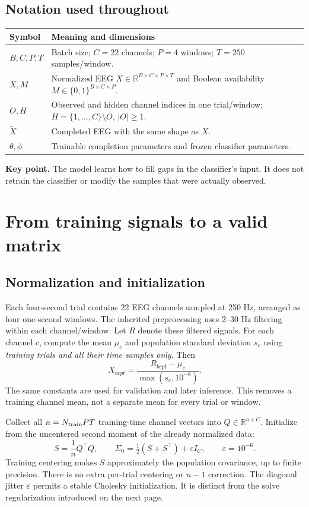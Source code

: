 \documentclass[11pt,a4paper]{article}
\newcommand{\R}{\mathbb R}
\newcommand{\takeaway}[1]{\par\smallskip\noindent\colorbox{pale}{\parbox{\dimexpr\linewidth-2\fboxsep\relax}{\textbf{Key point.} #1}}\par\smallskip}
\begin{document}
\subsection*{Notation used throughout}
\begin{tabularx}{\linewidth}{@{}lY@{}}\toprule
Symbol & Meaning and dimensions \\ \midrule
$B,C,P,T$ & Batch size; $C=22$ channels; $P=4$ windows; $T=250$ samples/window. \\
$X,M$ & Normalized EEG $X\in\R^{B\times C\times P\times T}$ and Boolean availability $M\in\{0,1\}^{B\times C\times P}$. \\
$O,H$ & Observed and hidden channel indices in one trial/window; $H=\{1,\ldots,C\}\setminus O$, $|O|\geq1$. \\
$\widetilde X$ & Completed EEG with the same shape as $X$. \\
$\theta,\phi$ & Trainable completion parameters and frozen classifier parameters. \\ \bottomrule
\end{tabularx}
\takeaway{The model learns how to fill gaps in the classifier's input. It does
not retrain the classifier or modify the samples that were actually observed.}

\newpage
\section{From training signals to a valid matrix}
\subsection{Normalization and initialization}
Each four-second trial contains 22 EEG channels sampled at 250 Hz, arranged
as four one-second windows. The inherited preprocessing uses 2--30 Hz filtering
within each channel/window. Let $R$ denote these filtered signals. For each
channel $c$, compute the mean $\mu_c$ and population standard deviation $s_c$
using \emph{training trials and all their time samples only}. Then
\begin{equation}
 X_{bcpt}=\frac{R_{bcpt}-\mu_c}{\max(s_c,10^{-8})}.
 \label{eq:norm}
\end{equation}
The same constants are used for validation and later inference. This removes a
training channel mean, not a separate mean for every trial or window.

Collect all $n=N_{\rm train}PT$ training-time channel vectors into
$Q\in\R^{n\times C}$. Initialize from the uncentered second moment of the
already normalized data:
\begin{equation}
 S=\frac1n Q^\top Q,\qquad
 \Sigma_0=\tfrac12(S+S^\top)+\varepsilon I_C,\qquad \varepsilon=10^{-6}.
 \label{eq:init}
\end{equation}
Training centering makes $S$ approximately the population covariance, up to
finite precision. There is no extra per-trial centering or $n-1$ correction.
The diagonal jitter $\varepsilon$ permits a stable Cholesky initialization.
It is distinct from the solve regularization introduced on the next page.
\end{document}
